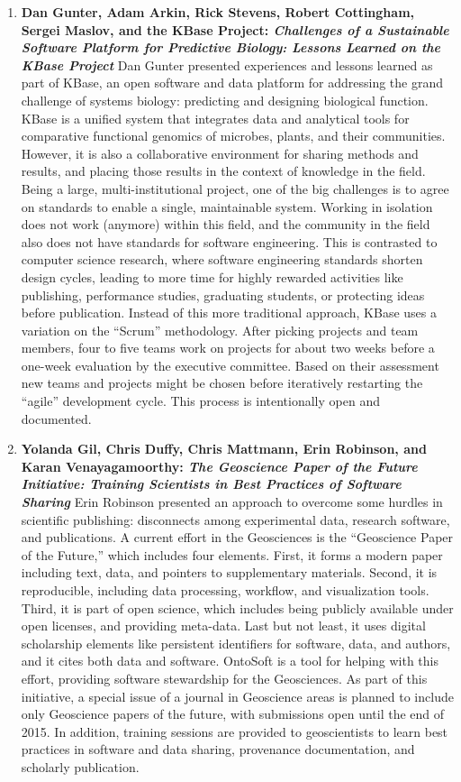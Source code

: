 \documentclass[11pt, oneside]{amsart}
\begin{document}
\begin{enumerate}
\item \textbf{Dan Gunter, Adam Arkin, Rick Stevens, Robert Cottingham, Sergei
Maslov, and the KBase Project: \textit{Challenges of a Sustainable Software
Platform for Predictive Biology: Lessons Learned on the KBase Project}} 
Dan Gunter presented experiences and lessons learned as part of KBase, an
open software and data platform for addressing the grand challenge of systems
biology: predicting and designing biological function. KBase is a unified system
that integrates data and analytical tools for comparative functional genomics of
microbes, plants, and their communities. However, it is also a collaborative
environment for sharing methods and results, and placing those results in the
context of knowledge in the field. Being a large, multi-institutional project,
one of the big challenges is to agree on standards to enable a single,
maintainable system. Working in isolation does not work (anymore) within this
field, and the community in the field also does not have standards for software
engineering. This is contrasted to computer science research, where software
engineering standards shorten design cycles, leading to more time for highly
rewarded activities like publishing, performance studies, graduating students,
or protecting ideas before publication. Instead of this more traditional
approach, KBase uses a variation on the ``Scrum'' methodology. After picking
projects and team members, four to five teams work on projects for about two
weeks before a one-week evaluation by the executive committee. Based on their
assessment new teams and projects might be chosen before iteratively restarting
the ``agile'' development cycle. This process is intentionally open and
documented.

\item \textbf{Yolanda Gil, Chris Duffy, Chris Mattmann, Erin Robinson, and Karan
Venayagamoorthy: \textit{The Geoscience Paper of the Future Initiative: Training
Scientists in Best Practices of Software Sharing}} Erin Robinson presented an
approach to overcome some hurdles in scientific publishing: disconnects among
experimental data, research software, and publications. A current effort in the
Geosciences is the ``Geoscience Paper of the Future,'' which includes four
elements. First, it forms a modern paper including text, data, and pointers to
supplementary materials. Second, it is reproducible, including data processing,
workflow, and visualization tools. Third, it is part of open science, which
includes being publicly available under open licenses, and providing meta-data.
Last but not least, it uses digital scholarship elements like persistent
identifiers for software, data, and authors, and it cites both data and
software. OntoSoft is a tool for helping with this effort, providing software stewardship
for the Geosciences. As part of this initiative, a special issue of a journal in
Geoscience areas is planned to include only Geoscience papers of the future,
with submissions open until the end of 2015. In addition, training sessions are
provided to geoscientists to learn best practices in software and data sharing,
provenance documentation, and scholarly publication.


\end{enumerate}
\end{document}

